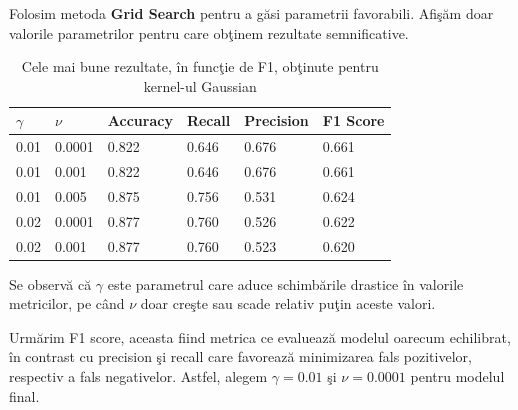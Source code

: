 Folosim metoda \textbf{Grid Search} pentru a găsi parametrii favorabili. Afişăm 
doar valorile parametrilor pentru care obţinem rezultate semnificative.

\begin{table}[H]
  \centering
  \begin{tabularx}{\textwidth}{
      |X
      |X
      |X
      |X
      |X
      |X|
  }
  \hline
  $\gamma$ & $\nu$ & {Accuracy} & {Recall} & {Precision} & {F1 Score} \\
  \hline
  \rowcolor{gray!20} 0.01 &  0.0001	&  0.822 &  0.646	&  0.676	&  0.661  \\
  0.01	&  0.001 &  0.822	&  0.646	&  0.676	&  0.661 \\
  \rowcolor{gray!20} 0.01 & 0.005 &  0.875 &  0.756	&  0.531	&  0.624  \\
  0.02 & 0.0001	& 0.877 &  0.760 &  0.526	&  0.622 \\
  \rowcolor{gray!20} 0.02 &  0.001	&  0.877 & 0.760 &  0.523	&  0.620 \\
  \hline
  \end{tabularx}
  \caption{Cele mai bune rezultate, în funcţie de F1, obţinute pentru kernel-ul Gaussian}
\end{table}

Se observă că $\gamma$ este parametrul care aduce schimbările drastice în valorile 
metricilor, pe când $\nu$ doar creşte sau scade relativ puţin aceste valori.

Urmărim F1 score, aceasta fiind metrica ce evaluează modelul oarecum 
echilibrat, în contrast cu precision şi recall care favorează minimizarea fals pozitivelor, 
respectiv a fals negativelor. Astfel, alegem $\gamma=0.01$ şi $\nu=0.0001$ pentru modelul final.

